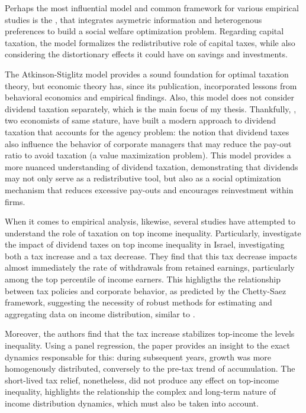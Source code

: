 \documentclass[11pt,a4paper]{article}
\begin{document}
Perhaps the most influential model and common framework for various empirical studies is the \cite{atkinson_design_1976}, that integrates asymetric information and heterogenous preferences to build a social welfare optimization problem.
Regarding capital taxation, the model formalizes the redistributive role of capital taxes, while also considering the distortionary effects it could have on savings and investments.
\par
The Atkinson-Stiglitz model provides a sound foundation for optimal taxation theory, but economic theory has, since its publication, incorporated lessons from behavioral economics and empirical findings. 
Also, this model does not consider dividend taxation separately, which is the main focus of my thesis.
Thankfully, \cite{chetty_agency_2007}, two economists of same stature, have built a modern approach to dividend taxation that accounts for the agency problem: the notion that dividend taxes also influence the behavior of corporate managers that may reduce the pay-out ratio to avoid taxation (a value maximization problem).
This model provides a more nuanced understanding of dividend taxation, demonstrating that dividends may not only serve as a redistributive tool, but also as a social optimization mechanism that reduces excessive pay-outs and encourages reinvestment within firms.
\pagebreak
\par
When it comes to empirical analysis, likewise, several studies have attempted to understand the role of taxation on top income inequality. 
Particularly, \cite{berman2024capital} investigate the impact of dividend taxes on top income inequality in Israel, investigating both a tax increase and a tax decrease. 
They find that this tax decrease impacts almost immediately the rate of withdrawals from retained earnings, particularly among the top percentile of income earners.
This highligths the relationship between tax policies and corporate behavior, as predicted by the Chetty-Saez framework, suggesting the necessity of robust methods for estimating and aggregating data on income distribution, similar to \cite{piketty_distributional_nodate}.
\par
Moreover, the authors find that the tax increase stabilizes top-income the levels inequality.
Using a panel regression, the paper provides an insight to the exact dynamics responsable for this: during subsequent years, growth was more homogenously distributed, conversely to the pre-tax trend of accumulation. 
The short-lived tax relief, nonetheless, did not produce any effect on top-income inequality, highlights the relationship the complex and long-term nature of income distribution dynamics, which must also be taken into account.
\end{document}
